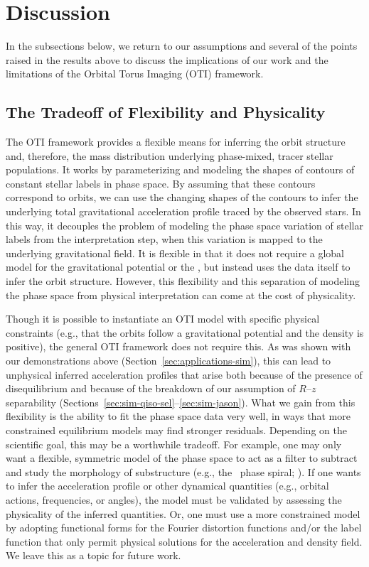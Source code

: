 \documentclass[modern]{aastex631}
\begin{document}


\section{Discussion} \label{sec:discussion}

In the subsections below, we return to our assumptions and several of the points raised
in the results above to discuss the implications of our work and the limitations of the
Orbital Torus Imaging (OTI) framework.

\subsection{The Tradeoff of Flexibility and Physicality} \label{sec:disc-tradeoff}

The OTI framework provides a flexible means for inferring the orbit structure and,
therefore, the mass distribution underlying phase-mixed, tracer stellar populations.
It works by parameterizing and modeling the shapes of contours of constant stellar
labels in phase space.
By assuming that these contours correspond to orbits, we can use the changing shapes of
the contours to infer the underlying total gravitational acceleration profile traced by
the observed stars.
In this way, it decouples the problem of modeling the phase space variation of stellar
labels from the interpretation step, when this variation is mapped to the underlying
gravitational field.
It is flexible in that it does not require a global model for the gravitational
potential or the \df, but instead uses the data itself to infer the orbit structure.
However, this flexibility and this separation of modeling the phase space from physical
interpretation can come at the cost of physicality.

Though it is possible to instantiate an OTI model with specific physical constraints
(e.g., that the orbits follow a gravitational potential and the density is positive),
the general OTI framework does not require this.
As was shown with our demonstrations above (Section~\ref{sec:applications-sim}), this
can lead to unphysical inferred acceleration profiles that arise both because of the
presence of disequilibrium and because of the breakdown of our assumption of $R$--$z$
separability (Sections~\ref{sec:sim-qiso-sel}--\ref{sec:sim-jason}).
What we gain from this flexibility is the ability to fit the phase space data very well,
in ways that more constrained equilibrium models may find stronger residuals.
Depending on the scientific goal, this may be a worthwhile tradeoff.
For example, one may only want a flexible, symmetric model of the phase space to act as
a filter to subtract and study the morphology of substructure (e.g., the \gaia\ phase
spiral; \citealt{Antoja:2018}).
If one wants to infer the acceleration profile or other dynamical quantities (e.g.,
orbital actions, frequencies, or angles), the model must be validated by assessing the
physicality of the inferred quantities.
Or, one must use a more constrained model by adopting functional forms for the Fourier
distortion functions and/or the label function that only permit physical solutions for
the acceleration and density field.
We leave this as a topic for future work.
\end{document}
